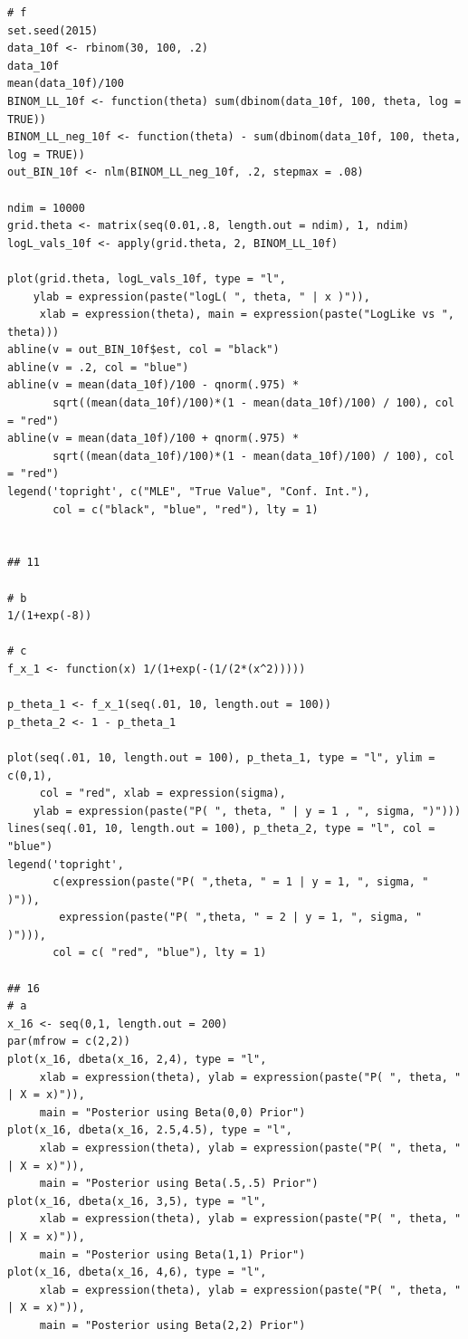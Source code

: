 \documentclass[12pt]{article}\usepackage[]{graphicx}\usepackage[]{color}
\begin{document}
\begin{verbatim}
# f
set.seed(2015)
data_10f <- rbinom(30, 100, .2)
data_10f
mean(data_10f)/100
BINOM_LL_10f <- function(theta) sum(dbinom(data_10f, 100, theta, log = TRUE))
BINOM_LL_neg_10f <- function(theta) - sum(dbinom(data_10f, 100, theta, log = TRUE))
out_BIN_10f <- nlm(BINOM_LL_neg_10f, .2, stepmax = .08)

ndim = 10000
grid.theta <- matrix(seq(0.01,.8, length.out = ndim), 1, ndim)
logL_vals_10f <- apply(grid.theta, 2, BINOM_LL_10f)

plot(grid.theta, logL_vals_10f, type = "l", 
    ylab = expression(paste("logL( ", theta, " | x )")),
     xlab = expression(theta), main = expression(paste("LogLike vs ", theta)))
abline(v = out_BIN_10f$est, col = "black")
abline(v = .2, col = "blue")
abline(v = mean(data_10f)/100 - qnorm(.975) * 
       sqrt((mean(data_10f)/100)*(1 - mean(data_10f)/100) / 100), col = "red")
abline(v = mean(data_10f)/100 + qnorm(.975) * 
       sqrt((mean(data_10f)/100)*(1 - mean(data_10f)/100) / 100), col = "red")
legend('topright', c("MLE", "True Value", "Conf. Int."),
       col = c("black", "blue", "red"), lty = 1)


## 11

# b
1/(1+exp(-8))

# c
f_x_1 <- function(x) 1/(1+exp(-(1/(2*(x^2)))))

p_theta_1 <- f_x_1(seq(.01, 10, length.out = 100))
p_theta_2 <- 1 - p_theta_1

plot(seq(.01, 10, length.out = 100), p_theta_1, type = "l", ylim = c(0,1), 
     col = "red", xlab = expression(sigma),
    ylab = expression(paste("P( ", theta, " | y = 1 , ", sigma, ")")))
lines(seq(.01, 10, length.out = 100), p_theta_2, type = "l", col = "blue")
legend('topright', 
       c(expression(paste("P( ",theta, " = 1 | y = 1, ", sigma, " )")), 
        expression(paste("P( ",theta, " = 2 | y = 1, ", sigma, " )"))),
       col = c( "red", "blue"), lty = 1)

## 16 
# a 
x_16 <- seq(0,1, length.out = 200)
par(mfrow = c(2,2))
plot(x_16, dbeta(x_16, 2,4), type = "l",
     xlab = expression(theta), ylab = expression(paste("P( ", theta, " | X = x)")),
     main = "Posterior using Beta(0,0) Prior")
plot(x_16, dbeta(x_16, 2.5,4.5), type = "l",
     xlab = expression(theta), ylab = expression(paste("P( ", theta, " | X = x)")),
     main = "Posterior using Beta(.5,.5) Prior")
plot(x_16, dbeta(x_16, 3,5), type = "l",
     xlab = expression(theta), ylab = expression(paste("P( ", theta, " | X = x)")),
     main = "Posterior using Beta(1,1) Prior")
plot(x_16, dbeta(x_16, 4,6), type = "l",
     xlab = expression(theta), ylab = expression(paste("P( ", theta, " | X = x)")),
     main = "Posterior using Beta(2,2) Prior")


\end{verbatim}
\end{document}
